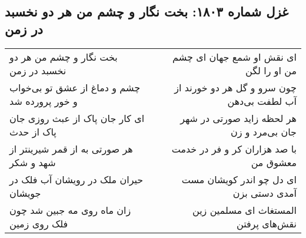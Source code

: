 \begin{center}
\section*{غزل شماره ۱۸۰۳: بخت نگار و چشم من هر دو نخسبد در زمن}
\label{sec:1803}
\begin{longtable}{l p{0.5cm} r}
بخت نگار و چشم من هر دو نخسبد در زمن
&&
ای نقش او شمع جهان ای چشم من او را لگن
\\
چشم و دماغ از عشق تو بی‌خواب و خور پرورده شد
&&
چون سرو و گل هر دو خورند از آب لطفت بی‌دهن
\\
ای کار جان پاک از عبث روزی جان پاک از حدث
&&
هر لحظه زاید صورتی در شهر جان بی‌مرد و زن
\\
هر صورتی به از قمر شیرینتر از شهد و شکر
&&
با صد هزاران کر و فر در خدمت معشوق من
\\
حیران ملک در رویشان آب فلک در جویشان
&&
ای دل چو اندر کویشان مست آمدی دستی بزن
\\
زان ماه روی مه جبین شد چون فلک روی زمین
&&
المستغاث ای مسلمین زین نقش‌های پرفتن
\\
\end{longtable}
\end{center}
